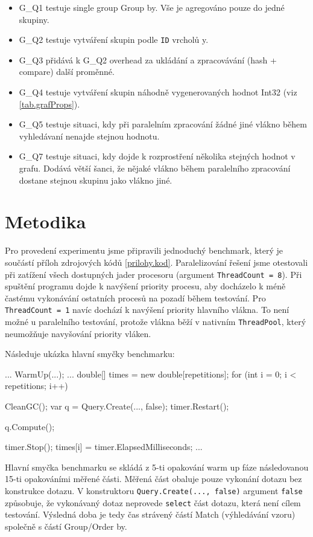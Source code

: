 \begin{itemize}

\item G\_Q1 testuje single group Group by. Vše je agregováno pouze do jedné skupiny. 
\item G\_Q2 testuje vytváření skupin podle \verb+ID+ vrcholů y.
\item G\_Q3 přidává k G\_Q2 overhead za ukládání a zpracovávání (hash + compare) další proměnné.
\item G\_Q4 testuje vytváření skupin náhodně vygenerovaných hodnot Int32 (viz \ref{tab.grafProps}). 
\item G\_Q5 testuje situaci, kdy při paralelním zpracování žádné jiné vlákno během vyhledávaní nenajde stejnou hodnotu.
\item G\_Q7 testuje situaci, kdy dojde k rozprostření několika stejných hodnot v grafu. Dodává větší šanci, že nějaké vlákno během paralelního zpracování dostane stejnou skupinu jako vlákno jiné.

\end{itemize}

\section{Metodika}

Pro provedení experimentu jsme připravili jednoduchý benchmark, který je součástí příloh zdrojových kódů \ref{prilohy.kod}.
Paralelizování řešení jsme otestovali při zatížení všech dostupných jader procesoru (argument \verb+ThreadCount = 8+).
Při spuštění programu dojde k navýšení priority procesu, aby docházelo k méně častému vykonávání ostatních procesů na pozadí během testování. 
Pro \verb+ThreadCount = 1+ navíc dochází k navýšení priority hlavního vlákna. 
To není možné u paralelního testování, protože vlákna běží v nativním \verb+ThreadPool+, který neumožňuje navyšování priority vláken.

Následuje ukázka hlavní smyčky benchmarku:

\begin{code}
...
 WarmUp(...);
...
double[] times = new double[repetitions];
for (int i = 0; i < repetitions; i++)
{
    CleanGC(); 
    var q = Query.Create(..., false); 
    timer.Restart();

    q.Compute();

    timer.Stop();
    times[i] = timer.ElapsedMilliseconds;
    ...
}
\end{code}

Hlavní smyčka benchmarku se skládá z 5-ti opakování warm up fáze následovanou 15-ti opakováními měřené části. 
Měřená část obaluje pouze vykonání dotazu bez konstrukce dotazu. 
V konstruktoru \verb+Query.Create(..., false)+ argument \verb+false+ způsobuje, že vykonávaný dotaz neprovede \verb+select+ část dotazu, která není cílem testování.
Výsledná doba je tedy čas strávený částí Match (výhledávání vzoru) společně s částí Group/Order by. 

